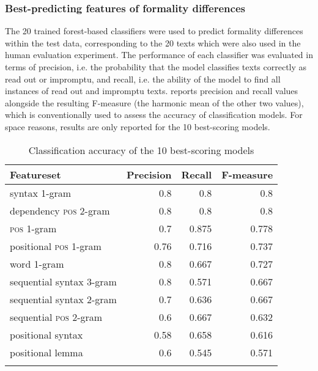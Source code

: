 \documentclass[output=paper]{langscibook}
\begin{document}
\subsubsection{Best-predicting features of formality differences}\label{sec:ivaska:4.2.1}

The 20 trained forest-based classifiers were used to predict formality differences within the test data, corresponding to the 20 texts which were also used in the human evaluation experiment. The performance of each classifier was evaluated in terms of precision, i.e. the probability that the model classifies texts correctly as read out or impromptu, and recall, i.e. the ability of the model to find all instances of read out and impromptu texts.  reports precision and recall values alongside the resulting F-measure (the harmonic mean of the other two values), which is conventionally used to assess the accuracy of classification models. For space reasons, results are only reported for the 10 best-scoring models.

\begin{table}
\begin{tabularx}{\textwidth}{Qrrr}

\lsptoprule

{\bfseries Featureset} & {\bfseries Precision} & {\bfseries Recall} & {\bfseries F-measure}\\
\midrule
syntax 1-gram & 0.8 & 0.8 & 0.8\\
dependency \textsc{pos} 2-gram & 0.8 & 0.8 & 0.8\\
\textsc{pos} 1-gram & 0.7 & 0.875 & 0.778\\
positional \textsc{pos} 1-gram & 0.76 & 0.716 & 0.737\\
word 1-gram & 0.8 & 0.667 & 0.727\\
sequential syntax 3-gram & 0.8 & 0.571 & 0.667\\
sequential syntax 2-gram & 0.7 & 0.636 & 0.667\\
sequential \textsc{pos} 2-gram & 0.6 & 0.667 & 0.632\\
positional syntax & 0.58 & 0.658 & 0.616\\
positional lemma & 0.6 & 0.545 & 0.571\\
\lspbottomrule
\end{tabularx}
\caption{Classification accuracy of the 10 best-scoring models}
\label{tab:ivaska:5}
\end{table}
\end{document}
